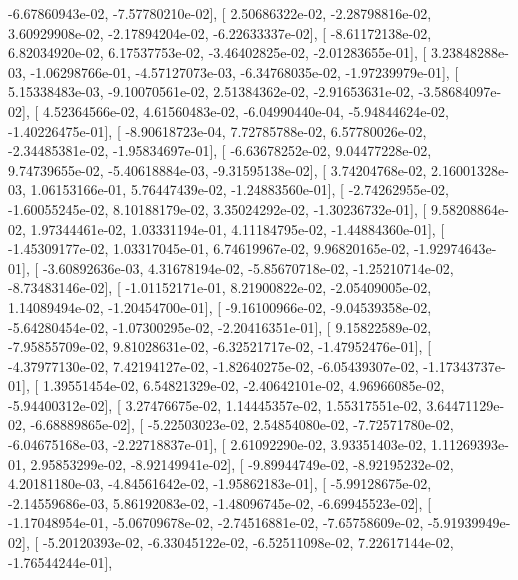 \documentclass{article}
\begin{document}
         -6.67860943e-02,  -7.57780210e-02],
       [  2.50686322e-02,  -2.28798816e-02,   3.60929908e-02,
         -2.17894204e-02,  -6.22633337e-02],
       [ -8.61172138e-02,   6.82034920e-02,   6.17537753e-02,
         -3.46402825e-02,  -2.01283655e-01],
       [  3.23848288e-03,  -1.06298766e-01,  -4.57127073e-03,
         -6.34768035e-02,  -1.97239979e-01],
       [  5.15338483e-03,  -9.10070561e-02,   2.51384362e-02,
         -2.91653631e-02,  -3.58684097e-02],
       [  4.52364566e-02,   4.61560483e-02,  -6.04990440e-04,
         -5.94844624e-02,  -1.40226475e-01],
       [ -8.90618723e-04,   7.72785788e-02,   6.57780026e-02,
         -2.34485381e-02,  -1.95834697e-01],
       [ -6.63678252e-02,   9.04477228e-02,   9.74739655e-02,
         -5.40618884e-03,  -9.31595138e-02],
       [  3.74204768e-02,   2.16001328e-03,   1.06153166e-01,
          5.76447439e-02,  -1.24883560e-01],
       [ -2.74262955e-02,  -1.60055245e-02,   8.10188179e-02,
          3.35024292e-02,  -1.30236732e-01],
       [  9.58208864e-02,   1.97344461e-02,   1.03331194e-01,
          4.11184795e-02,  -1.44884360e-01],
       [ -1.45309177e-02,   1.03317045e-01,   6.74619967e-02,
          9.96820165e-02,  -1.92974643e-01],
       [ -3.60892636e-03,   4.31678194e-02,  -5.85670718e-02,
         -1.25210714e-02,  -8.73483146e-02],
       [ -1.01152171e-01,   8.21900822e-02,  -2.05409005e-02,
          1.14089494e-02,  -1.20454700e-01],
       [ -9.16100966e-02,  -9.04539358e-02,  -5.64280454e-02,
         -1.07300295e-02,  -2.20416351e-01],
       [  9.15822589e-02,  -7.95855709e-02,   9.81028631e-02,
         -6.32521717e-02,  -1.47952476e-01],
       [ -4.37977130e-02,   7.42194127e-02,  -1.82640275e-02,
         -6.05439307e-02,  -1.17343737e-01],
       [  1.39551454e-02,   6.54821329e-02,  -2.40642101e-02,
          4.96966085e-02,  -5.94400312e-02],
       [  3.27476675e-02,   1.14445357e-02,   1.55317551e-02,
          3.64471129e-02,  -6.68889865e-02],
       [ -5.22503023e-02,   2.54854080e-02,  -7.72571780e-02,
         -6.04675168e-03,  -2.22718837e-01],
       [  2.61092290e-02,   3.93351403e-02,   1.11269393e-01,
          2.95853299e-02,  -8.92149941e-02],
       [ -9.89944749e-02,  -8.92195232e-02,   4.20181180e-03,
         -4.84561642e-02,  -1.95862183e-01],
       [ -5.99128675e-02,  -2.14559686e-03,   5.86192083e-02,
         -1.48096745e-02,  -6.69945523e-02],
       [ -1.17048954e-01,  -5.06709678e-02,  -2.74516881e-02,
         -7.65758609e-02,  -5.91939949e-02],
       [ -5.20120393e-02,  -6.33045122e-02,  -6.52511098e-02,
          7.22617144e-02,  -1.76544244e-01],
\end{document}
